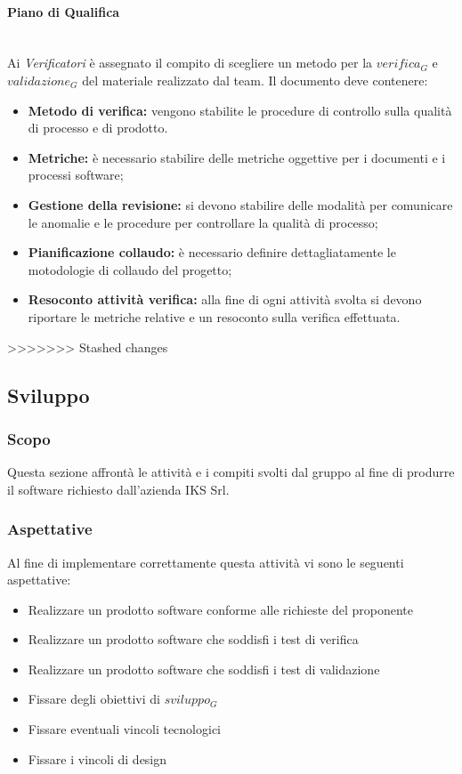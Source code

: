 		\paragraph{Piano di Qualifica} \mbox{} \\
		Ai \emph{Verificatori} è assegnato il compito di scegliere un metodo per la $verifica_G$ e $validazione_G$ del materiale realizzato dal team.
		Il documento deve contenere:
		\begin{itemize}
		\item \textbf{Metodo di verifica:} vengono stabilite le procedure di controllo sulla qualità di processo e di prodotto. 
		\item \textbf{Metriche:} è necessario stabilire delle metriche oggettive per i documenti e i processi software;
		\item \textbf{Gestione della revisione:} si devono stabilire delle modalità per comunicare le anomalie e le procedure per controllare la qualità di processo;
		\item \textbf{Pianificazione collaudo:} è necessario definire dettagliatamente le motodologie di collaudo del progetto;
		\item \textbf{Resoconto attività verifica:} alla fine di ogni attività svolta si devono riportare le metriche relative e un resoconto sulla verifica effettuata.
		\end{itemize}
			
>>>>>>> Stashed changes
	
\subsection{Sviluppo}
	\subsubsection{Scopo}
	Questa sezione affrontà le attività e i compiti svolti dal gruppo al fine di produrre il software richiesto dall'azienda IKS Srl.
	
	\subsubsection{Aspettative}
	Al fine di implementare correttamente questa attività vi sono le seguenti aspettative:
	\begin{itemize}
		\item Realizzare un prodotto software conforme alle richieste del proponente
		\item Realizzare un prodotto software che soddisfi i test di verifica
		\item Realizzare un prodotto software che soddisfi i test di validazione
		\item Fissare degli obiettivi di $sviluppo_G$
		\item Fissare eventuali vincoli tecnologici
		\item Fissare i vincoli di design
	\end{itemize}
	
